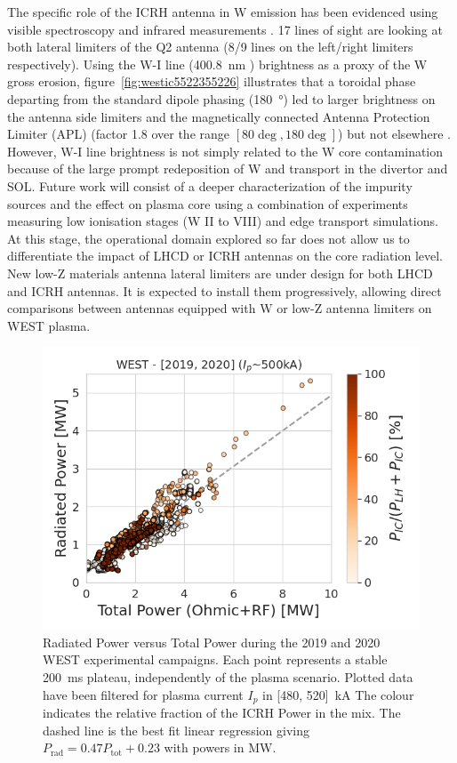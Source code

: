 \documentclass[12p]{iopart}
\begin{document}
The specific role of the ICRH antenna in W emission has been evidenced using visible spectroscopy and infrared measurements \cite{colas2020, urbanczyk2019, urbanczyk2021}. 17 lines of sight are looking at both lateral limiters of the Q2 antenna (8/9 lines on the left/right limiters respectively). Using the W-I line (\SI{400.8}{\nano\meter} ) brightness as a proxy of the W gross erosion, figure~\ref{fig:westic5522355226} illustrates that a toroidal phase departing from the standard dipole phasing (\SI{180}{\degree}) led to larger brightness on the antenna side limiters and the magnetically connected Antenna Protection Limiter (APL) (factor 1.8 over the range $[80\deg,180\deg]$) but not elsewhere \cite{urbanczyk2019}. However, W-I line brightness is not simply related to the W core contamination because of the large prompt redeposition of W and transport in the divertor and SOL. Future work will consist of a deeper characterization of the impurity sources and the effect on plasma core using a combination of experiments measuring low ionisation stages (W II to VIII) and edge transport simulations. At this stage, the operational domain explored so far does not allow us to differentiate the impact of LHCD or ICRH antennas on the core radiation level. New low-Z materials antenna lateral limiters are under design for both LHCD and ICRH antennas. It is expected to install them progressively, allowing direct comparisons between antennas equipped with W or low-Z antenna limiters on WEST plasma.

\begin{figure}
	\centering
	\includegraphics[width=0.95\linewidth]{figures/WEST_C4_C5_Prad_vs_Ptot}
	\caption{Radiated Power versus Total Power during the 2019 and 2020 WEST experimental campaigns. Each point represents a stable 200~ms plateau, independently of the plasma scenario. Plotted data have been filtered for plasma current $I_p$ in [480, 520]~kA  The colour indicates the relative fraction of the ICRH Power in the mix. The dashed line is the best fit linear regression giving $P_{\mathrm{rad}}=0.47 P_{\mathrm{tot}} + 0.23$ with powers in MW.}
	\label{fig:westc4c5pradvsptot}
\end{figure}
\end{document}
